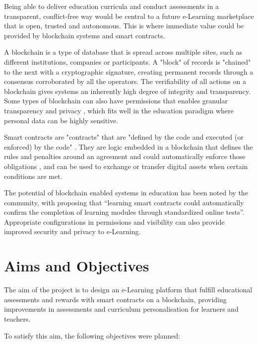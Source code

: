 Being able to deliver education curricula and conduct assessments in a transparent, conflict-free way would be central to 
a future e-Learning marketplace that is open, trusted and autonomous.
This is where immediate value could be provided by blockchain systems and smart contracts.

A blockchain is a type of database that is spread across multiple sites, such as different institutions, companies 
or participants. A "block" of records is "chained" to the next with a cryptographic signature, creating permanent records 
through a consensus corroborated by all the operators. \citep[p.17]{walport2016distributed}
The verifiability of all actions on a blockchain gives systems an inherently high degree of integrity and transparency. 
Some types of blockchain can also have permissions that enables granular transparency and privacy \citep[p.22]{walport2016distributed}, 
which fits well in the education paradigm where personal data can be highly sensitive.

Smart contracts are "contracts" that are "defined by the code and executed (or enforced) by the code" \citep[p.16]{swan2015blockchain}.
They are logic embedded in a blockchain that defines the rules and penalties around an agreement and could automatically enforce 
those obligations \citep{gulhane2017ibm}, and can be used to exchange or transfer digital assets when certain conditions are met. 

The potential of blockchain enabled systems in education has been noted by the community, with \citet[p.62]{swan2015blockchain} 
proposing that “learning smart contracts could automatically confirm the completion of learning modules through standardized 
online tests”. Appropriate configurations in permissions and visibility can also provide improved security and privacy to e-Learning.

\section{Aims and Objectives} %

The aim of the project is to design an e-Learning platform that fulfill educational assessments and 
rewards with smart contracts on a blockchain, providing improvements in assessments and curriculum 
personalisation for learners and teachers.

To satisfy this aim, the following objectives were planned:

